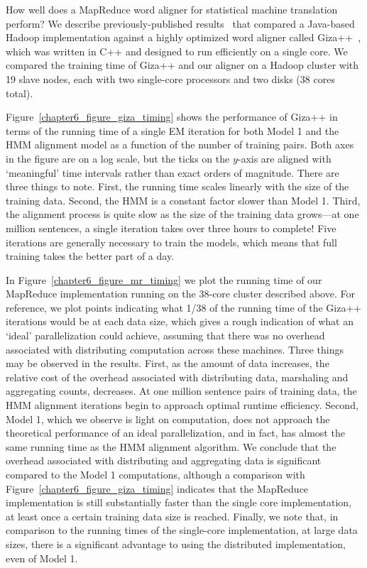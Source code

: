 How well does a MapReduce word aligner for statistical machine
translation perform?  We describe previously-published
results~\cite{Dyer_etal_2008} that compared a Java-based Hadoop
implementation against a highly optimized word aligner called
Giza++~\cite{Och_2003}, which was written in C++ and designed to run
efficiently on a single core.  We compared the training time of Giza++
and our aligner on a Hadoop cluster with 19 slave nodes, each with two
single-core processors and two disks (38 cores total).

Figure~\ref{chapter6_figure_giza_timing} shows the performance of
Giza++ in terms of the running time of a single EM iteration for both
Model 1 and the HMM alignment model as a function of the number of
training pairs.  Both axes in the figure are on a log scale, but the
ticks on the $y$-axis are aligned with `meaningful' time intervals
rather than exact orders of magnitude.  There are three things to
note.  First, the running time scales linearly with the size of the
training data.  Second, the HMM is a constant factor slower than Model
1.  Third, the alignment process is quite slow as the size of the
training data grows---at one million sentences, a single iteration
takes over three hours to complete!  Five iterations are generally
necessary to train the models, which means that full training takes
the better part of a day.

In Figure~\ref{chapter6_figure_mr_timing} we plot the running time of
our MapReduce implementation running on the 38-core cluster described
above.  For reference, we plot points indicating what 1/38 of the
running time of the Giza++ iterations would be at each data size,
which gives a rough indication of what an `ideal' parallelization
could achieve, assuming that there was no overhead associated with
distributing computation across these machines.  Three things may be
observed in the results.  First, as the amount of data increases, the
relative cost of the overhead associated with distributing data,
marshaling and aggregating counts, decreases.  At one million sentence
pairs of training data, the HMM alignment iterations begin to approach
optimal runtime efficiency.  Second, Model 1, which we observe is
light on computation, does not approach the theoretical performance of
an ideal parallelization, and in fact, has almost the same running
time as the HMM alignment algorithm. We conclude that the overhead
associated with distributing and aggregating data is significant
compared to the Model 1 computations, although a comparison with
Figure~\ref{chapter6_figure_giza_timing} indicates that the MapReduce
implementation is still substantially faster than the single core
implementation, at least once a certain training data size is reached.
Finally, we note that, in comparison to the running times of the
single-core implementation, at large data sizes, there is a
significant advantage to using the distributed implementation, even of
Model 1.


